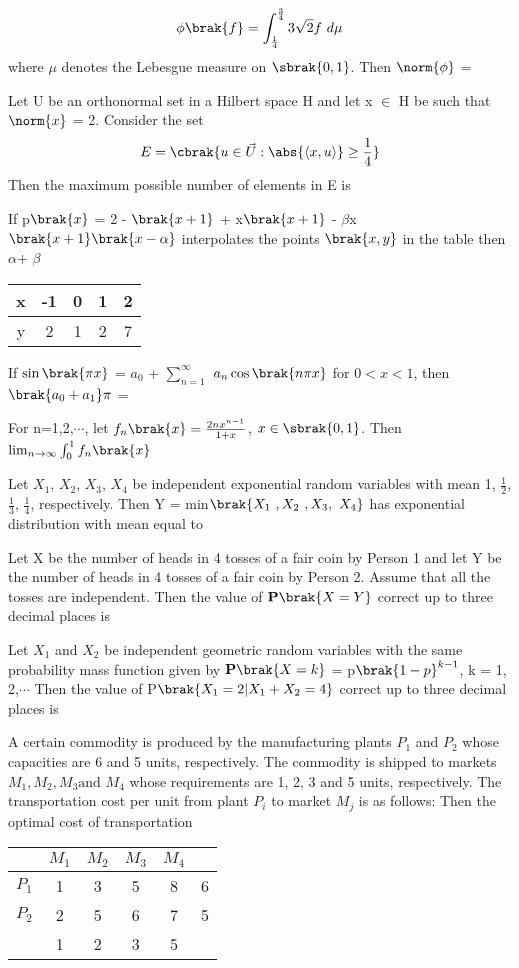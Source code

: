 \begin{align*}
    \phi{\brak{f}}=\int_\frac{1}{4}^{\frac{3}{4}} 3\sqrt{2}f\,\,d\mu
\end{align*}
 where $\mu$ denotes the Lebesgue measure on $\sbrak{0,1}$. Then $\norm{\phi}$ =
\item Let U be an orthonormal set in a Hilbert space H and let x $\in$ H be such that $\norm{x}$ = 2. Consider the set
\begin{align*}
    E=\cbrak{u\in \vec{U}:\abs{\langle x,u\rangle}\geq \frac{1}{4}}
\end{align*}
Then the maximum possible number of elements in E is
\item If p$\brak{x}$ = 2 - $\brak{x + 1}$ + x$\brak{x + 1}$ - $\beta$x$\brak{x + 1}\brak{x - \alpha}$ interpolates the points $\brak{x, y}$ in the table then $\alpha$+ $\beta$
\begin{tabular}{|c|c|c|c|c|}
\hline
x & -1 & 0 & 1 & 2\\
\hline
y & 2 & 1 & 2 & 7 \\
\hline
\end{tabular}
\item If $\sin\brak{\pi x}$ = $a_0$ + $\sum_{n=1}^{\infty}$ $a_n \cos\brak{n\pi x}$ for $0<x<1$, then $\brak{a_0+a_1}\pi$ =
\item For n=1,2,$\cdots$, let $f_n\brak{x}=\frac{2nx^{n-1}}{1+x}$, $x\in\sbrak{0,1}$. Then $\lim_{n \to \infty} \int_{0}^{1} f_n\brak{x}$
\item Let $X_1$, $X_2$, $X_3$, $X_4$ be independent exponential random variables with mean 1, $\frac{1}{2}$, $\frac{1}{3}$, $\frac{1}{4}$, respectively. Then Y = min$\brak{X_1\,\,, X_2\,\,, X_3,\,\, X_4}$ has exponential distribution with mean equal to 
\item Let X be the number of heads in 4 tosses of a fair coin by Person 1 and let Y be the number of heads in 4 tosses of a fair coin by Person 2. Assume that all the tosses are independent. Then the value of $\mathbf{P}\brak{X = Y}$ correct up to three decimal places is 
\item Let $X_1$ and $X_2$ be independent geometric random variables with the same probability mass function given by $\mathbf{P}\brak{X = k}$ = p$\brak{1 - p}^{k-1}$, k = 1, 2,$\cdots$ Then the value of P$
\brak{X_1 = 2|X_1 + X_2 = 4}$ correct up to three decimal places is 
\item A certain commodity is produced by the manufacturing plants $P_1$ and $P_2$ whose capacities are 6 and 5 units, respectively. The commodity is shipped to markets $M_1, M_2, M_3 \text{and}\,\, M_4$ whose requirements are 1, 2, 3 and 5 units, respectively. The transportation cost per unit from plant $P_i$ to market $M_j$ is as follows:
Then the optimal cost of transportation
\begin{tabular}{|c|c|c|c|c|c|}
\hline
  & $M_1$ &$M_2$ & $M_3$ & $M_4$ & \\
  \hline
  $P_1$ & 1&3 &5 &8&6\\
  \hline
  $P_2$ & 2&5& 6&7&5\\
  \hline
  & 1&2&3&5&\\
\hline
\end{tabular}


